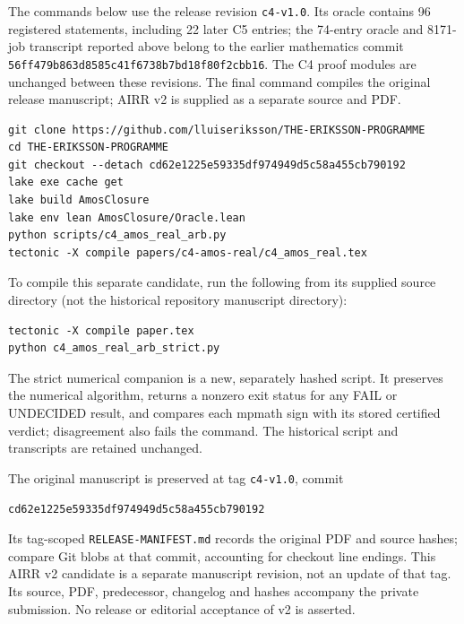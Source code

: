 \documentclass[11pt]{article}
\newcommand{\lean}[1]{\texttt{#1}}
\begin{document}
\medskip
\noindent The commands below use the release revision
\lean{c4-v1.0}. Its oracle contains 96 registered statements,
including 22 later C5 entries; the 74-entry oracle and 8171-job
transcript reported above belong to the earlier mathematics commit
\lean{56ff479b863d8585c41f6738b7bd18f80f2cbb16}.
The C4 proof modules are unchanged between these revisions.
The final command compiles the original release manuscript;
AIRR v2 is supplied as a separate source and PDF.
\begin{verbatim}
git clone https://github.com/lluiseriksson/THE-ERIKSSON-PROGRAMME
cd THE-ERIKSSON-PROGRAMME
git checkout --detach cd62e1225e59335df974949d5c58a455cb790192
lake exe cache get
lake build AmosClosure
lake env lean AmosClosure/Oracle.lean
python scripts/c4_amos_real_arb.py
tectonic -X compile papers/c4-amos-real/c4_amos_real.tex
\end{verbatim}
To compile this separate candidate, run the following from its supplied
source directory (not the historical repository manuscript directory):
\begin{verbatim}
tectonic -X compile paper.tex
python c4_amos_real_arb_strict.py
\end{verbatim}
The strict numerical companion is a new, separately hashed script. It
preserves the numerical algorithm, returns a nonzero exit status for
any FAIL or UNDECIDED result, and compares each mpmath sign with its
stored certified verdict; disagreement also fails the command. The
historical script and transcripts are retained unchanged.
{\sloppy
The original manuscript is preserved at tag \lean{c4-v1.0}, commit
\begin{center}\small
\lean{cd62e1225e59335df974949d5c58a455cb790192}
\end{center}
\noindent
Its tag-scoped \lean{RELEASE-MANIFEST.md} records the original PDF
and source hashes; compare Git blobs at that commit, accounting for
checkout line endings. This AIRR v2 candidate is a separate manuscript
revision, not an update of that tag. Its source, PDF, predecessor,
changelog and hashes accompany the private submission. No release or
editorial acceptance of v2 is asserted.\par}
\end{document}
